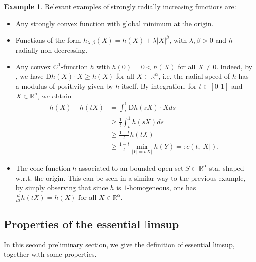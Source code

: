 \documentclass[a4paper,11pt]{article}
\numberwithin{equation}{section}
\newcommand{\numberset}{\mathbb}
\newcommand{\R}{\numberset{R}}
\newcommand{\rom}{\mathrm}
\theoremstyle{definition}
\newtheorem{Example}[Theorem]{Example}
\begin{document}
\begin{Example}\label{Ex}
Relevant examples of strongly radially increasing functions are:
\begin{itemize}
\item Any strongly convex function with global minimum at the origin.
\item Functions of the form $h_{\lambda,\beta}(X)=h(X)+\lambda|X|^\beta$, with $\lambda,\beta>0$ and $h$ radially non-decreasing. 
\item Any convex $C^1$-function $h$ with $h(0)=0<h(X)$ for all $X\neq0$. Indeed, by \cite[Thm 2.52]{Dac}, we have $\rom Dh(X)\cdot X\geq h(X)$ for all $X\in \R^\alpha$, i.e. the radial speed of $h$ has a modulus of positivity given by $h$ itself. By integration, for $t\in[0,1]$ and $X\in \R^\alpha$, we obtain
\begin{align*}
h(X)-h(tX)&=\int_t^{1}\rom Dh(sX)\cdot Xds\\
&\geq\frac1t\int_t^1h(sX)ds\\
&\geq\frac{1-t}th(tX)\\
&\geq\frac{1-t}t\min_{|Y|=t|X|}h(Y)=:c(t,|X|).
\end{align*}
\item The cone function $h$ associated to an bounded open set $S\subset\R^\alpha$ star shaped w.r.t. the origin. This can be seen in a similar way to the previous example, by simply observing that since $h$ is $1$-homogeneous, one has $\frac{d}{dt}h(tX)=h(X)$ for all $X\in \R^\alpha$.

\end{itemize}
\end{Example}




\subsection{Properties of the essential limsup}
In this second preliminary section, we give the definition of essential limsup, together with some properties.
\end{document}
